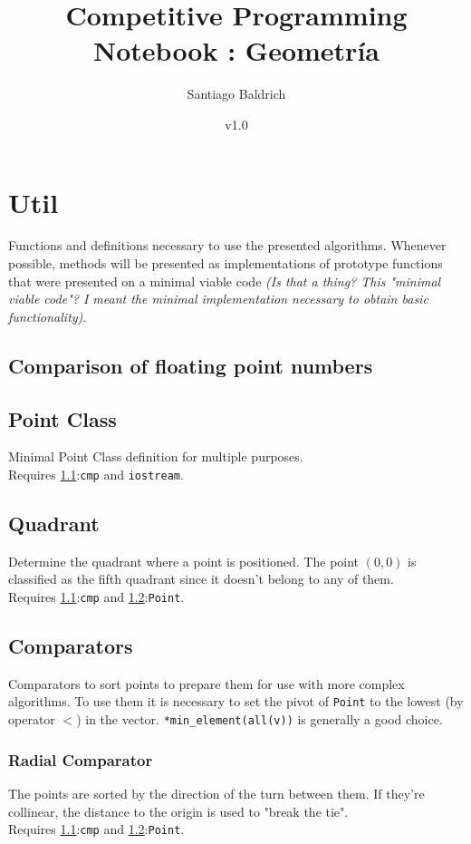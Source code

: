 \documentclass[11pt, oneside]{article}   	%
\title{Competitive Programming Notebook : Geometr\'ia}
\author{Santiago Baldrich}
\date{v1.0}
\begin{document}
\tableofcontents
\newpage



\section{Util}
Functions and definitions necessary to use the presented algorithms. Whenever possible, methods will be presented as implementations of prototype functions that were presented on a minimal viable code \textit{(Is that a thing? This "minimal viable code"? I meant the minimal implementation necessary to obtain basic functionality)}.


\subsection{Comparison of floating point numbers }\label{util:cmp}

\subsection{Point Class}\label{util:point}
	Minimal Point Class definition for multiple purposes.\\ Requires \ref{util:cmp}:\verb|cmp| and \verb|iostream|.
\subsection{Quadrant}
Determine the quadrant where a point is positioned. The point $(0,0)$ is classified as the fifth quadrant since it doesn't belong to any of them.\\
Requires \ref{util:cmp}:\verb|cmp| and \ref{util:point}:\verb|Point|.


\subsection{Comparators}
Comparators to sort points to prepare them for use with more complex algorithms. To use them it is necessary to set the pivot of \verb|Point| to the lowest (by operator $<$) in the vector. \verb|*min_element(all(v))| is generally a good choice.
\subsubsection{Radial Comparator}\label{util:radcomp}
The points are sorted by the direction of the turn between them. If they're collinear, the distance to the origin is used to "break the tie".\\
Requires \ref{util:cmp}:\verb|cmp| and \ref{util:point}:\verb|Point|.
\end{document}
